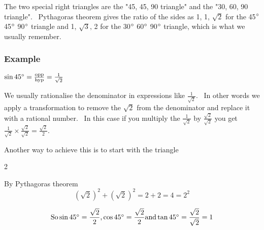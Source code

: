 The two special right triangles are the "45, 45, 90 triangle" and the "30, 60, 90 triangle". \ Pythagoras
theorem gives the ratio of the sides as 1, 1, $\sqrt{2}$ for the 45$\mbox{{\ensuremath{{}^\circ}}}$ 45$\mbox{{\ensuremath{{}^\circ}}}$ 90$\mbox{{\ensuremath{{}^\circ}}}$ triangle and 1, $\sqrt{3}\text{,}$ 2 for the 30$\mbox{{\ensuremath{{}^\circ}}}$ 60$\mbox{{\ensuremath{{}^\circ}}}$ 90$\mbox{{\ensuremath{{}^\circ}}}$ triangle, which is what we usually remember. 

\subsubsection{Example}
$\sin  45 \mbox{{\ensuremath{{}^\circ}}} =\frac{\text{opp}}{\text{hyp}} =\frac{1}{\sqrt{2}}$ 

We usually rationalise the denominator in expressions like $\frac{1}{\sqrt{2}}$. \ In other words we apply a transformation to remove the $\sqrt{2}$ from the denominator and replace it with a rational number. \ In this case if you multiply
the $\frac{1}{\sqrt{2}}$ by $\frac{\sqrt{2}}{\sqrt{2}}$ you get $\frac{1}{\sqrt{2}} \times \frac{\sqrt{2}}{\sqrt{2}} =\frac{\sqrt{2}}{2}$. 

Another way to achieve this is to start with the triangle 


\columnsep =30pt
\begin {multicols}{2}
 

   
\setlength\fboxrule{0in}\setlength\fboxsep{0.2in}


By Pythagoras theorem
\begin{equation*}\left (\sqrt{2}\right )^{2} +\left (\sqrt{2}\right )^{2} =2 +2 =4 =2^{2}
\end{equation*}


\end {multicols}
\begin{equation*}\text{So}\sin  45 \mbox{{\ensuremath{{}^\circ}}} =\frac{\sqrt{2}}{2}\text{,}\cos  45 \mbox{{\ensuremath{{}^\circ}}} =\frac{\sqrt{2}}{2}\text{and}\tan  45 \mbox{{\ensuremath{{}^\circ}}} =\frac{\sqrt{2}}{\sqrt{2}} =1
\end{equation*}

